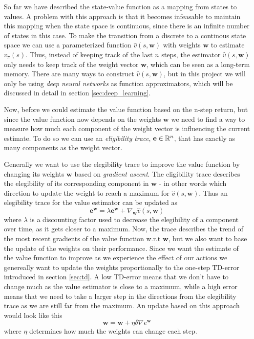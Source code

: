 \documentclass[11pt]{article}
\begin{document}
So far we have described the state-value function as a mapping from states to values.
A problem with this approach is that it becomes infeasable to maintain this mapping
when the state space is continuous, since there is an infinite number of states in this case.
To make the transition from a discrete to a continous state space we can use a
parameterized function $\hat{v}(s, \mathbf{w})$ with weights $\mathbf{w}$
to estimate $v_\pi(s)$.
Thus, instead of keeping track of the last $n$ steps, the estimator $\hat{v}(s, \mathbf{w})$
only needs to keep track of the weight vector $\mathbf{w}$, which can be seen as a long-term memory.
There are many ways to construct $\hat{v}(s, \mathbf{w})$, but in this project we will only
be using \textit{deep neural networks} as function approximators,
which will be discussed in detail in section \ref{sec:deep_learning}.

Now, before we could estimate the value function based on the n-step return, but
since the value function now depends on the weights $\mathbf{w}$ we need to find a way
to measure how much each component of the weight vector is influencing the
current estimate.
To do so we can use an \textit{eligibility trace}, $\mathbf{e} \in \mathbb{R}^n$, that
has exactly as many components as the weight vector.

Generally we want to use the elegibility trace to improve the value function by
changing its weights $\mathbf{w}$ based on \textit{gradient ascent}.
The eligibility trace describes the elegibility of its corresponding component in $\mathbf{w}$
- in other words which direction to update the weight to reach a maximum for $\hat{v}(s, \mathbf{w})$.
Thus an elegibility trace for the value estimator can be updated as
\begin{equation}
    \mathbf{e}^\mathbf{w} = \lambda \mathbf{e}^\mathbf{w} + \nabla_\mathbf{w} \hat{v}(s, \mathbf{w})
\end{equation}
where $\lambda$ is a discounting factor used to decrease the elegibility of a component
over time, as it gets closer to a maximum.
Now, the trace describes the trend of the most recent gradients of the value function
w.r.t $\mathbf{w}$, but we also want to base the update of the weights on their
performance.
Since we want the estimate of the value function to improve as we
experience the effect of our actions we genereally want to
update the weights proportionally to the one-step TD-error introduced in
section \ref{sec:td}.
A low TD-error means that we don't have to change much as the value estimator is
close to a maximum, while a high error means that we need to take a larger step
in the directions from the elegibility trace as we are still far from the maximum.
An update based on this approach would look like this
\begin{equation}
    \mathbf{w} = \mathbf{w} + \eta \delta \nabla e^\mathbf{w}
\end{equation}
where $\eta$ determines how much the weights can change each step.
\end{document}
